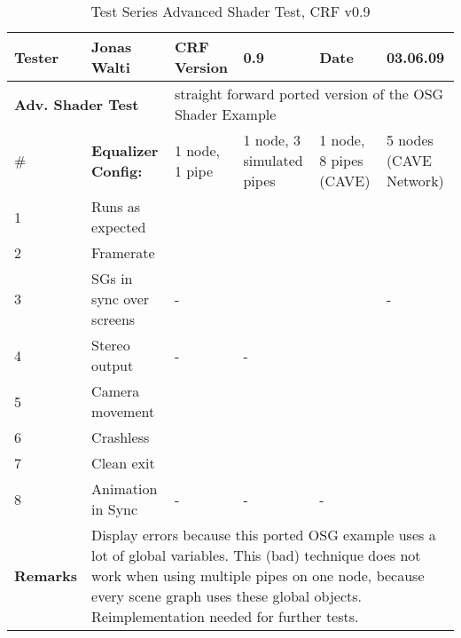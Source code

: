 \begin{table}[H]
	\centering
	\begin{tabular}{|b{}|b{}|m{}|m{}|m{}|m{}|}
		\hline
		\bfseries Tester & Jonas Walti & \bfseries CRF Version & 0.9 & \bfseries Date & 03.06.09 \\
		\hline
		\hline
		\multicolumn{2}{|l|}{\large{\bfseries Adv. Shader Test}} & \multicolumn{4}{p{0.6\textwidth}|}{straight forward ported version of the OSG Shader Example} \\
		\hline
		\hline
		\# & \bfseries Equalizer Config: & 1 node, 1 pipe & 1 node, 3 simulated pipes &  1 node, 8 pipes (CAVE) &  5 nodes (CAVE Network) \\
		\hline 1 & Runs as expected & \tick & \cross & \cross & \tick \\
		\hline 2 & Framerate & \quad\quad 60 & \quad\quad 20 & \quad\quad 70 & \quad\quad 300 \\
		\hline 3 & SGs in sync over screens & \quad\quad- & \cross & \cross & - \\
		\hline 4 & Stereo output & \quad\quad- & - & \tick & \tick \\
		\hline 5 & Camera movement & \tick & \cross & \cross & \tick\\
		\hline 6 & Crashless & \tick & \tick & \tick & \tick\\
		\hline 7 & Clean exit & \tick & \tick & \tick & \tick \\
		\hline 8 & Animation in Sync & \quad\quad- & - & \quad\quad- & \tick \\
		\hline
		\hline \bfseries Remarks & \multicolumn{5}{p{0.85\textwidth}|}{Display errors because this ported OSG example uses a lot of global variables. This (bad) technique does not work when using multiple pipes on one node, because every scene graph uses these global objects. Reimplementation needed for further tests.}\\
		\hline
	\end{tabular}
	\caption{Test Series Advanced Shader Test, CRF v0.9}
\end{table}

